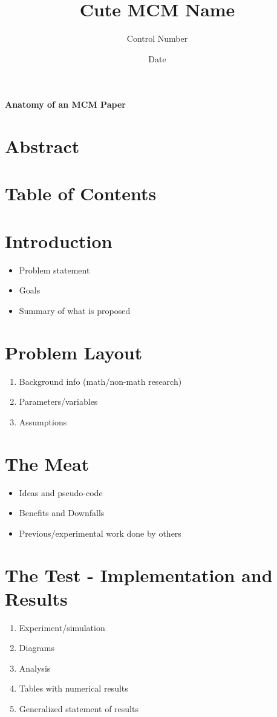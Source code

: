 \documentclass[10pt]{article}
\begin{document}
\title{Cute MCM Name}
\author{Control Number}
\date{Date}
\maketitle

\newpage

\begin{center}
\textbf{Anatomy of an MCM Paper}
\end{center}

\tableofcontents
\newpage
\section{Abstract}
\section{Table of Contents}
\section{Introduction}

\begin{itemize}
\item Problem statement
\item Goals
\item Summary of what is proposed
\end{itemize}

\section{Problem Layout}

\begin{enumerate}
\item Background info (math/non-math research)
\item Parameters/variables
\item Assumptions
\end{enumerate}

\section{The Meat}
\begin{itemize}
\item Ideas and pseudo-code
\item Benefits and Downfalls
\item Previous/experimental work done by others
\end{itemize}
\section{The Test - Implementation and Results}
\begin{enumerate}
\item Experiment/simulation
\item Diagrams
\item Analysis
\item Tables with numerical results
\item Generalized statement of results
\end{enumerate}
\end{document}
